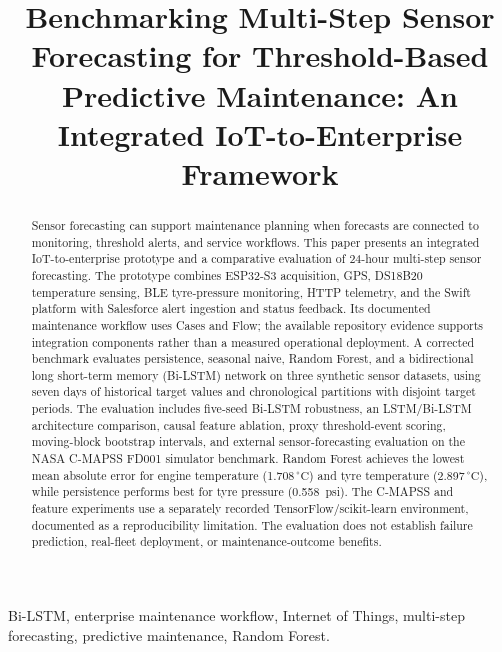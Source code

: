 \documentclass[conference]{IEEEtran}
\newcommand{\degC}{\ensuremath{\,^\circ\mathrm{C}}}
\begin{document}
\title{Benchmarking Multi-Step Sensor Forecasting for Threshold-Based Predictive Maintenance: An Integrated IoT-to-Enterprise Framework}
\author{
}
\maketitle

\begin{abstract}
Sensor forecasting can support maintenance planning when forecasts are connected to monitoring, threshold alerts, and service workflows. This paper presents an integrated IoT-to-enterprise prototype and a comparative evaluation of 24-hour multi-step sensor forecasting. The prototype combines ESP32-S3 acquisition, GPS, DS18B20 temperature sensing, BLE tyre-pressure monitoring, HTTP telemetry, and the Swift platform with Salesforce alert ingestion and status feedback. Its documented maintenance workflow uses Cases and Flow; the available repository evidence supports integration components rather than a measured operational deployment. A corrected benchmark evaluates persistence, seasonal naive, Random Forest, and a bidirectional long short-term memory (Bi-LSTM) network on three synthetic sensor datasets, using seven days of historical target values and chronological partitions with disjoint target periods. The evaluation includes five-seed Bi-LSTM robustness, an LSTM/Bi-LSTM architecture comparison, causal feature ablation, proxy threshold-event scoring, moving-block bootstrap intervals, and external sensor-forecasting evaluation on the NASA C-MAPSS FD001 simulator benchmark. Random Forest achieves the lowest mean absolute error for engine temperature (1.708\degC) and tyre temperature (2.897\degC), while persistence performs best for tyre pressure (0.558~psi). The C-MAPSS and feature experiments use a separately recorded TensorFlow/scikit-learn environment, documented as a reproducibility limitation. The evaluation does not establish failure prediction, real-fleet deployment, or maintenance-outcome benefits.
\end{abstract}
\begin{IEEEkeywords}
Bi-LSTM, enterprise maintenance workflow, Internet of Things, multi-step forecasting, predictive maintenance, Random Forest.
\end{IEEEkeywords}
\end{document}
